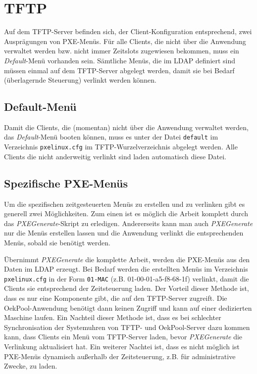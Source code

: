 \documentclass[	
				a4paper, 
				twoside,
				11pt,
				DIV11,
				BCOR12mm,
				bibtotoc, 
				halfparskip, 
				headsepline, 
				pointlessnumbers]{scrartcl}
\begin{document}
\section{TFTP}
Auf dem TFTP-Server befinden sich, der Client-Konfiguration entsprechend, zwei Ausprägungen von PXE-Menüs.
Für alle Clients, die nicht über die Anwendung verwaltet werden bzw. nicht immer Zeitslots zugewiesen bekommen, muss ein \textit{Default}-Menü vorhanden sein.
Sämtliche Menüs, die im LDAP definiert sind müssen einmal auf dem TFTP-Server abgelegt werden, damit sie bei Bedarf (überlagernde Steuerung) verlinkt werden können.


\subsection{Default-Menü}
Damit die Clients, die (momentan) nicht über die Anwendung verwaltet werden, das \textit{Default}-Menü booten können, muss es unter der Datei \verb+default+ im Verzeichnis \verb+pxelinux.cfg+ im TFTP-Wurzelverzeichnis abgelegt werden.
Alle Clients die nicht anderweitig verlinkt sind laden automatisch diese Datei.
\subsection{Spezifische PXE-Menüs}
Um die spezifischen zeitgesteuerten Menüs zu erstellen und zu verlinken gibt es generell zwei Möglichkeiten.
Zum einen ist es möglich die Arbeit komplett durch das \textit{PXEGenerate}-Skript zu erledigen.
Andererseits kann man auch \textit{PXEGenerate} nur die Menüs erstellen lassen und die Anwendung verlinkt die entsprechenden Menüs, sobald sie benötigt werden.

Übernimmt \textit{PXEGenerate} die komplette Arbeit, werden die PXE-Menüs aus den Daten im LDAP erzeugt.
Bei Bedarf werden die erstellten Menüs im Verzeichnis \verb+pxelinux.cfg+ in der Form \verb+01-MAC+ (z.B. 01-00-01-a5-f8-68-1f) verlinkt, damit die Clients sie entsprechend der Zeitsteuerung laden.
Der Vorteil dieser Methode ist, dass es nur eine Komponente gibt, die auf den TFTP-Server zugreift. Die OekPool-Anwendung benötigt dann keinen Zugriff und kann auf einer dedizierten Maschine laufen.
Ein Nachteil dieser Methode ist, dass es bei schlechter Synchronisation der Systemuhren von TFTP- und OekPool-Server dazu kommen kann, dass Clients ein Menü vom TFTP-Server laden, bevor \textit{PXEGenerate} die Verlinkung aktualisiert hat.
Ein weiterer Nachtei ist, dass es nicht möglich ist PXE-Menüs dynamisch außerhalb der Zeitsteuerung, z.B. für administrative Zwecke, zu laden.
\end{document}
